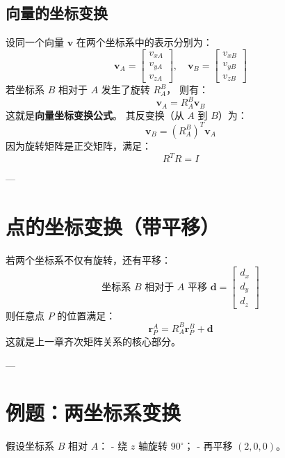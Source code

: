 \documentclass[12pt,a4paper]{article}
\begin{document}
\subsection{向量的坐标变换}
设同一个向量 $\boldsymbol{v}$ 在两个坐标系中的表示分别为：
\[
\boldsymbol{v}_A =
\begin{bmatrix} v_{xA}\\ v_{yA}\\ v_{zA} \end{bmatrix}, \quad
\boldsymbol{v}_B =
\begin{bmatrix} v_{xB}\\ v_{yB}\\ v_{zB} \end{bmatrix}
\]
若坐标系 $B$ 相对于 $A$ 发生了旋转 $R_{A}^{B}$，  
则有：
\[
\boxed{
\boldsymbol{v}_A = R_{A}^{B} \boldsymbol{v}_B
}
\]
这就是\textbf{向量坐标变换公式}。  
其反变换（从 $A$ 到 $B$）为：
\[
\boldsymbol{v}_B = (R_{A}^{B})^T \boldsymbol{v}_A
\]
因为旋转矩阵是正交矩阵，满足：
\[
R^T R = I
\]

---

\section{点的坐标变换（带平移）}
若两个坐标系不仅有旋转，还有平移：
\[
\text{坐标系 } B \text{ 相对于 } A \text{ 平移 } \boldsymbol{d} =
\begin{bmatrix} d_x \\ d_y \\ d_z \end{bmatrix}
\]
则任意点 $P$ 的位置满足：
\[
\boldsymbol{r}_P^A = R_{A}^{B} \boldsymbol{r}_P^B + \boldsymbol{d}
\]
这就是上一章齐次矩阵关系的核心部分。

---

\section{例题：两坐标系变换}
假设坐标系 $B$ 相对 $A$：
- 绕 $z$ 轴旋转 $90^\circ$；
- 再平移 $(2,0,0)$。
\end{document}

